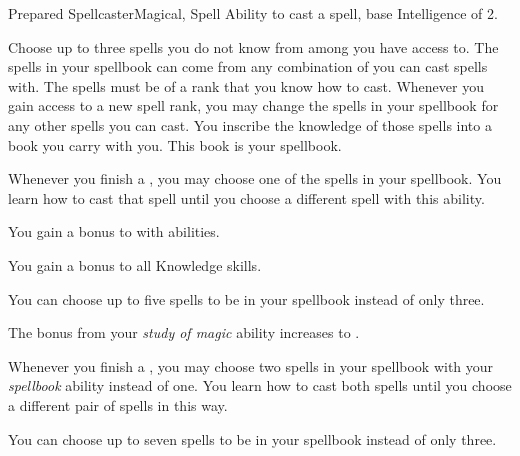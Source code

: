    \begin{feat}{Prepared Spellcaster}{Magical, Spell}
        \featpre Ability to cast a spell, base Intelligence of 2.

         Choose up to three spells you do not know from among  you have access to.
        The spells in your spellbook can come from any combination of  you can cast spells with.
        The spells must be of a rank that you know how to cast.
        Whenever you gain access to a new spell rank, you may change the spells in your spellbook for any other spells you can cast.
        You inscribe the knowledge of those spells into a book you carry with you.
        This book is your spellbook.
        
        Whenever you finish a , you may choose one of the spells in your spellbook.
        You learn how to cast that spell until you choose a different spell with this ability.

         You gain a  bonus to  with  abilities.

         You gain a  bonus to all Knowledge skills.

         You can choose up to five spells to be in your spellbook instead of only three.

         The bonus from your \textit{study of magic} ability increases to .

         Whenever you finish a , you may choose two spells in your spellbook with your \textit{spellbook} ability instead of one.
        You learn how to cast both spells until you choose a different pair of spells in this way.

         You can choose up to seven spells to be in your spellbook instead of only three.
    \end{feat}

